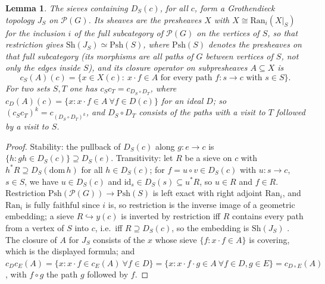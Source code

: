 \documentclass[11pt]{amsart}
\newtheorem{lem}[thm]{Lemma}
\theoremstyle{definition}
\newcommand{\Psh}{\mathrm{Psh}}
\newcommand{\Sh}{\mathrm{Sh}}
\newcommand{\Ran}{\mathrm{Ran}}
\newcommand{\cP}{\mathcal P}
\begin{document}
\begin{lem}\label{lem:JS}
The sieves containing $D_S(c)$, for all $c$, form a Grothendieck topology
$J_S$ on $\cP(G)$. Its sheaves are the presheaves $X$ with $X\cong
\Ran_i(X|_S)$ for the inclusion $i$ of the full subcategory of $\cP(G)$ on
the vertices of $S$, so that restriction gives $\Sh(J_S)\simeq\Psh(S)$,
where $\Psh(S)$ denotes the presheaves on that full subcategory (its
morphisms are all paths of $G$ between vertices of $S$, not only the edges
inside $S$), and its closure operator on
subpresheaves $A\subseteq X$ is
\[
c_S(A)(c)=\{x\in X(c):\ x\cdot f\in A\text{ for every path }f\colon s\to c
\text{ with }s\in S\}.
\]
For two sets $S,T$ one has $c_Sc_T=c_{D_S\circ D_T}$, where
$c_D(A)(c)=\{x:x\cdot f\in A\ \forall f\in D(c)\}$ for an ideal $D$; so
$(c_Sc_T)^k=c_{(D_S\circ D_T)^k}$, and $D_S\circ D_T$ consists of the paths
with a visit to $T$ followed by a visit to $S$.
\end{lem}
\begin{proof}
Stability: the pullback of $D_S(c)$ along $g\colon e\to c$ is $\{h:gh\in
D_S(c)\}\supseteq D_S(e)$. Transitivity: let $R$ be a sieve on $c$ with
$h^*R\supseteq D_S(\mathrm{dom}\,h)$ for all $h\in D_S(c)$; for
$f=u\circ v\in D_S(c)$ with $u\colon s\to c$, $s\in S$, we have $u\in
D_S(c)$ and $\mathrm{id}_s\in D_S(s)\subseteq u^*R$, so $u\in R$ and
$f\in R$. Restriction $\Psh(\cP(G))\to\Psh(S)$ is left exact with right
adjoint $\Ran_i$, and $\Ran_i$ is fully faithful since $i$ is, so
restriction is the inverse image of a geometric embedding; a sieve
$R\hookrightarrow y(c)$ is inverted by restriction iff $R$ contains every
path from a vertex of $S$ into $c$, i.e.\ iff $R\supseteq D_S(c)$, so the
embedding is $\Sh(J_S)$ \cite[A4.3, A4.5]{Elephant}. The closure of $A$
for $J_S$ consists of the $x$ whose sieve $\{f:x\cdot f\in A\}$ is
covering, which is the displayed formula; and $c_Dc_E(A)=\{x:x\cdot f\in
c_E(A)\ \forall f\in D\}=\{x:x\cdot f\cdot g\in A\ \forall f\in D,g\in E\}
=c_{D\circ E}(A)$, with $f\circ g$ the path $g$ followed by $f$.
\end{proof}
\end{document}
